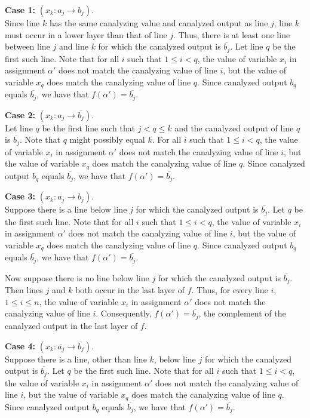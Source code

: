 {\bf Case 1:} $(x_k : a_j \rightarrow b_j)$. \\
Since line $k$ has the same canalyzing value and canalyzed output as line $j$,
line $k$ must occur in a lower layer than that of line $j$.
Thus, there is at least one line between line $j$ and line $k$ 
for which the canalyzed output is $\overline{b_j}$.
Let line $q$ be the first such line.
Note that for all $i$ such that $1 \leq i < q$, 
the value of variable $x_i$ in assignment $\alpha'$ does not match the canalyzing value of line $i$,
but the value of variable $x_q$ does match the canalyzing value of line $q$.
Since canalyzed output $b_q$ equals $\overline{b_j}$,
we have that $f(\alpha') = \overline{b_j}$.

{\bf Case 2:} $(x_k : a_j \rightarrow \overline{b_j})$. \\
Let line $q$ be the first line such that $j < q \leq k$ and
the canalyzed output of line $q$ is $\overline{b_j}$.
Note that $q$ might possibly equal $k$.
For all $i$ such that $1 \leq i < q$, 
the value of variable $x_i$ in assignment $\alpha'$ does not match the canalyzing value of line $i$,
but the value of variable $x_q$ does match the canalyzing value of line $q$.
Since canalyzed output $b_q$ equals $\overline{b_j}$,
we have that $f(\alpha') = \overline{b_j}$.

{\bf Case 3:} $(x_k : \overline{a_j} \rightarrow b_j)$. \\
Suppose there is a line below line $j$ for which the canalyzed output is $\overline{b_j}$.
Let $q$ be the first such line.
Note that for all $i$ such that $1 \leq i < q$, 
the value of variable $x_i$ in assignment $\alpha'$ does not match the canalyzing value of line $i$,
but the value of variable $x_q$ does match the canalyzing value of line $q$.
Since canalyzed output $b_q$ equals $\overline{b_j}$,
we have that $f(\alpha') = \overline{b_j}$.

Now suppose there is no line below line $j$ for which the canalyzed output is $\overline{b_j}$.
Then lines $j$ and $k$ both occur in the last layer of $f$.
Thus, for every line $i$, $1 \leq i \leq n$, 
the value of variable $x_i$ in assignment $\alpha'$ does not match the canalyzing value of line $i$.
Consequently, $f(\alpha') = \overline{b_j}$, the complement of the canalyzed output in the last layer of $f$.

{\bf Case 4:} $(x_k : \overline{a_j} \rightarrow \overline{b_j})$. \\
Suppose there is a line, other than line $k$, below line $j$ for which the canalyzed output is $\overline{b_j}$.
Let $q$ be the first such line.
Note that for all $i$ such that $1 \leq i < q$, 
the value of variable $x_i$ in assignment $\alpha'$ does not match the canalyzing value of line $i$,
but the value of variable $x_q$ does match the canalyzing value of line $q$.
Since canalyzed output $b_q$ equals $\overline{b_j}$,
we have that $f(\alpha') = \overline{b_j}$.


